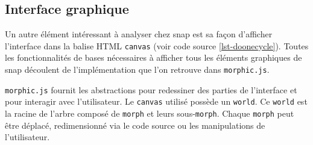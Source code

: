 %
%
%

\subsection{Interface graphique}
Un autre élément intéressant à analyser chez \gls{snap} est sa façon d'afficher l'interface dans la balise HTML \texttt{canvas} (voir code source \ref{lst-doonecycle}). Toutes les fonctionnalités de bases nécessaires à afficher tous les éléments graphiques de \gls{snap} découlent de l'implémentation que l'on retrouve dans \texttt{morphic.js}.

\texttt{morphic.js} fournit les abstractions pour redessiner des parties de l'interface et pour interagir avec l'utilisateur. Le \texttt{canvas} utilisé possède un \texttt{world}. Ce \texttt{world} est la racine de l'arbre composé de \texttt{morph} et leurs sous-\texttt{morph}. Chaque \texttt{morph} peut être déplacé, redimensionné via le code source ou les manipulations de l'utilisateur.


